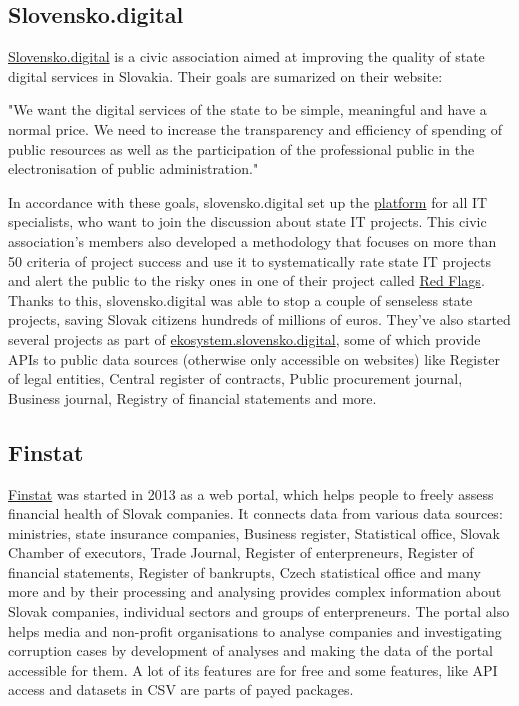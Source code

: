 \documentclass[thesis=B,english]{FITthesis}[2012/06/26]
\begin{document}
	\subsection{Slovensko.digital}
	\label{slovensko.digital}
	\href{https://slovensko.digital}{Slovensko.digital} is a civic association aimed at improving the quality of state digital services in Slovakia. 
	Their goals are sumarized on their website:
	\begin{displayquote}
		"We want the digital services of the state to be simple, meaningful and have a normal price. We need to increase the transparency and efficiency of spending of public resources as well as the participation of the professional public in the electronisation of public administration."
	\end{displayquote}
	In accordance with these goals, slovensko.digital set up the \href{https://platforma.slovensko.digital}{platform} for all IT specialists, who want to join the discussion about state IT projects. This civic association's members also developed a methodology that focuses on more than 50 criteria of project success and use it to systematically rate state IT projects and alert the public to the risky ones in one of their project called \href{https://redflags.slovensko.digital/}{Red Flags}. Thanks to this, slovensko.digital was able to stop a couple of senseless state projects, saving Slovak citizens hundreds of millions of euros. They've also started several projects as part of \href{https://ekosystem.slovensko.digital/}{ekosystem.slovensko.digital}, some of which provide APIs to public data sources (otherwise only accessible on websites) like Register of legal entities, Central register of contracts, Public procurement journal, Business journal, Registry of financial statements and more. 
	\subsection{Finstat}
	\label{finstat}
	\href{https://finstat.sk/}{Finstat} was started in 2013 as a web portal, which helps people to freely assess financial health of Slovak companies. It connects data from various data sources: ministries, state insurance companies, Business register, Statistical office, Slovak Chamber of executors, Trade Journal, Register of enterpreneurs, Register of financial statements, Register of bankrupts, Czech statistical office and many more and by their processing and analysing provides complex information about Slovak companies, individual sectors and groups of enterpreneurs. The portal also helps media and non-profit organisations to analyse companies and investigating corruption cases by development of analyses and making the data of the portal accessible for them. A lot of its features are for free and some features, like API access and datasets in CSV are parts of payed packages.
\end{document}
